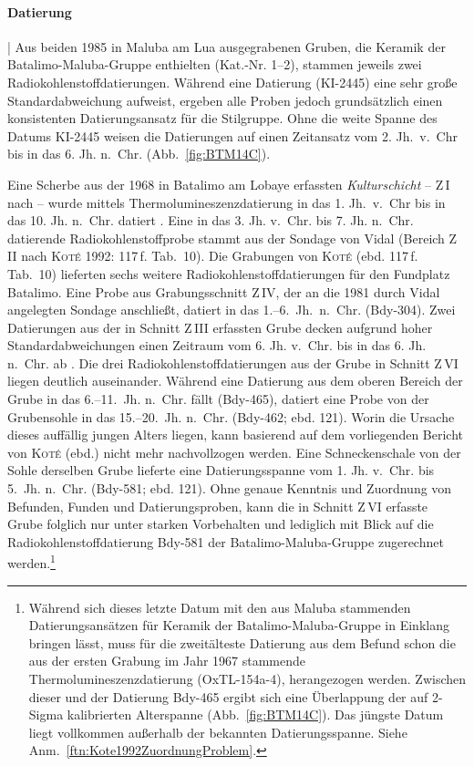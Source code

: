 \paragraph{Datierung}\hspace{-.5em}|\hspace{.5em}%
Aus beiden 1985 in Maluba am Lua ausgegrabenen Gruben, die Keramik der Batalimo-Maluba-Gruppe enthielten (Kat.-Nr. 1--2), stammen jeweils zwei Radiokohlenstoffdatierungen. Während eine Datierung (KI-2445) eine sehr große Standardabweichung aufweist, ergeben alle Proben jedoch grundsätzlich einen konsistenten Datierungsansatz für die Stilgruppe. Ohne die weite Spanne des Datums KI-2445 weisen die Datierungen auf einen Zeitansatz vom 2. Jh.~v.~Chr bis in das 6. Jh. n.~Chr. (Abb.~\ref{fig:BTM14C}).

Eine Scherbe aus der 1968 in Batalimo am Lobaye erfassten \textit{Kulturschicht} -- Z\,I nach \textcite[117\,f. Tab.~10]{Kote.1992} -- wurde mittels Thermolumineszenzdatierung in das 1. Jh.~v.~Chr bis in das 10. Jh. n.~Chr. datiert \parencite[233; OxTL-154a-4]{Aumassip.1975}. Eine in das 3. Jh. v.~Chr. bis 7. Jh. n.~Chr. datierende Radiokohlenstoffprobe stammt aus der Sondage von Vidal (Bereich Z\,II nach \textsc{Koté} 1992: 117\,f. Tab.~10). Die Grabungen von \textsc{Koté} (ebd. 117\,f. Tab.~10) lieferten sechs weitere Radiokohlenstoffdatierungen für den Fundplatz Batalimo. Eine Probe aus Grabungsschnitt Z\,IV, der an die 1981 durch Vidal angelegten Sondage anschließt, datiert in das 1.--6.~Jh.~n.~Chr. (Bdy-304). Zwei Datierungen aus der in Schnitt Z\,III erfassten Grube decken aufgrund hoher Standardabweichungen einen Zeitraum vom 6. Jh. v.~Chr. bis in das 6. Jh. n.~Chr. ab \parencite[Bdy-301, Bdy-306;][120]{Kote.1992}. Die drei Radiokohlenstoffdatierungen aus der Grube in Schnitt Z\,VI liegen deutlich auseinander. Während eine Datierung aus dem oberen Bereich der Grube in das 6.--11.~Jh. n.~Chr. fällt (Bdy-465), datiert eine Probe von der Grubensohle in das 15.--20.~Jh. n.~Chr. (Bdy-462; ebd. 121). Worin die Ursache dieses auffällig jungen Alters liegen, kann basierend auf dem vorliegenden Bericht von \textsc{Koté} (ebd.) nicht mehr nachvollzogen werden. Eine Schneckenschale von der Sohle derselben Grube lieferte eine Datierungsspanne vom 1. Jh. v.~Chr. bis 5.~Jh. n.~Chr. (Bdy-581; ebd. 121). Ohne genaue Kenntnis und Zuordnung von Befunden, Funden und Datierungsproben, kann die in Schnitt Z\,VI erfasste Grube folglich nur unter starken Vorbehalten und lediglich mit Blick auf die Radiokohlenstoffdatierung Bdy-581 der Batalimo-Maluba-Gruppe zugerechnet werden.\footnote{Während sich dieses letzte Datum mit den aus Maluba stammenden Datierungsansätzen für Keramik der Batalimo-Maluba-Gruppe in Einklang bringen lässt, muss für die zweitälteste Datierung aus dem Befund schon die aus der ersten Grabung im Jahr 1967 stammende Thermolumineszenzdatierung (OxTL-154a-4), herangezogen werden. Zwischen dieser und der Datierung Bdy-465 ergibt sich eine Überlappung der auf 2-Sigma kalibrierten Alterspanne (Abb.~\ref{fig:BTM14C}). Das jüngste Datum liegt vollkommen außerhalb der bekannten Datierungsspanne. Siehe Anm.~\ref{ftn:Kote1992ZuordnungProblem}.}

